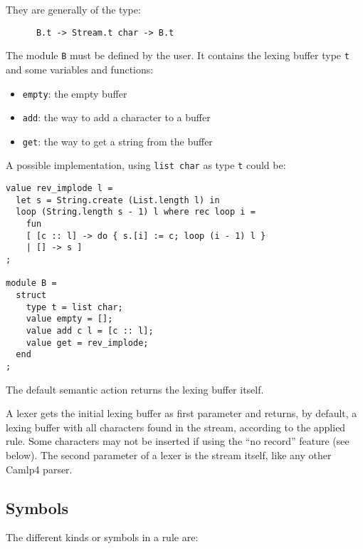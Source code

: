 \documentclass[11pt]{article}
\begin{document}
They are generally of the type:

\begin{verbatim}
      B.t -> Stream.t char -> B.t
\end{verbatim}

The module \verb/B/ must be defined by the user. It contains the
lexing buffer type \verb/t/ and some variables and functions:

\begin{itemize}
\item \verb/empty/: the empty buffer
\item \verb/add/: the way to add a character to a buffer
\item \verb/get/: the way to get a string from the buffer
\end{itemize}

A possible implementation, using \verb/list char/ as type \verb/t/ could be:

\begin{verbatim}
value rev_implode l =
  let s = String.create (List.length l) in
  loop (String.length s - 1) l where rec loop i =
    fun
    [ [c :: l] -> do { s.[i] := c; loop (i - 1) l }
    | [] -> s ]
;

module B =
  struct
    type t = list char;
    value empty = [];
    value add c l = [c :: l];
    value get = rev_implode;
  end
;
\end{verbatim}

The default semantic action returns the lexing buffer itself.

A lexer gets the initial lexing buffer as first parameter and returns,
by default, a lexing buffer with all characters found in the stream,
according to the applied rule. Some characters may not be inserted if
using the ``no record'' feature (see below). The second parameter of
a lexer is the stream itself, like any other Camlp4 parser.

\subsection{Symbols}

The different kinds or symbols in a rule are:
\end{document}
